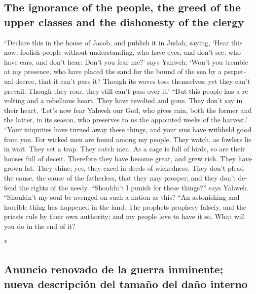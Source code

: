 \begin{paracol}{2}
\begin{otherlanguage}{english}
\hypertarget{the-ignorance-of-the-people-the-greed-of-the-upper-classes-and-the-dishonesty-of-the-clergy}{%
\subsection{The ignorance of the people, the greed of the upper classes
and the dishonesty of the
clergy}\label{the-ignorance-of-the-people-the-greed-of-the-upper-classes-and-the-dishonesty-of-the-clergy}}

 ``Declare this in the house of Jacob, and publish it in
Judah, saying,  `Hear this now, foolish people without
understanding, who have eyes, and don't see, who have ears, and don't
hear:  Don't you fear me?' says Yahweh; `Won't you
tremble at my presence, who have placed the sand for the bound of the
sea by a perpetual decree, that it can't pass it? Though its waves toss
themselves, yet they can't prevail. Though they roar, they still can't
pass over it.'  ``But this people has a revolting and a
rebellious heart. They have revolted and gone.  They
don't say in their heart, `Let's now fear Yahweh our God, who gives
rain, both the former and the latter, in its season, who preserves to us
the appointed weeks of the harvest.'  ``Your iniquities
have turned away these things, and your sins have withheld good from
you.  For wicked men are found among my people. They
watch, as fowlers lie in wait. They set a trap. They catch men.
 As a cage is full of birds, so are their houses full of
deceit. Therefore they have become great, and grew rich. 
They have grown fat. They shine; yes, they excel in deeds of wickedness.
They don't plead the cause, the cause of the fatherless, that they may
prosper; and they don't defend the rights of the needy. 
``Shouldn't I punish for these things?'' says Yahweh. ``Shouldn't my
soul be avenged on such a nation as this?  ``An
astonishing and horrible thing has happened in the land. 
The prophets prophesy falsely, and the priests rule by their own
authority; and my people love to have it so. What will you do in the end
of it?

\end{otherlanguage}

\switchcolumn[0]*

\hypertarget{anuncio-renovado-de-la-guerra-inminente-nueva-descripciuxf3n-del-tamauxf1o-del-dauxf1o-interno}{%
\subsection{Anuncio renovado de la guerra inminente; nueva descripción
del tamaño del daño
interno}\label{anuncio-renovado-de-la-guerra-inminente-nueva-descripciuxf3n-del-tamauxf1o-del-dauxf1o-interno}}


\end{paracol}
